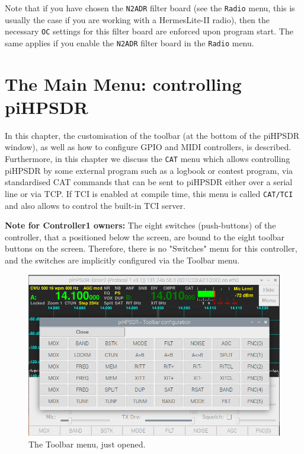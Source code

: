 \documentclass[12pt]{book}
\def\bltt#1{\texttt{\color{blue}#1}}
\def\pH{pi\-HPSDR\xspace}
\begin{document}
Note that if you have chosen the \texttt{N2ADR} filter board (see the \bltt{Radio} menu,
this is usually the
case if you are working with a HermesLite-II radio), then the necessary \bltt{OC}
settings for this filter board are enforced upon program start. The same applies if
you enable the \texttt{N2ADR} filter board in the \bltt{Radio} menu.

\chapter[Controlling \pH]{The Main Menu: controlling \pH}

In this chapter, the customisation of the toolbar (at the bottom of the \pH window),
as well as how to configure GPIO and MIDI controllers, is described. Furthermore, in this
chapter we discuss the \bltt{CAT} menu which allows controlling \pH by some external program
such as a logbook or contest program, via standardised CAT commands that can be sent to
\pH either over a serial line or via TCP. If TCI is enabled at compile  time, this menu
is called \bltt{CAT/TCI} and also allows to control the built-in TCI server.

\textbf{Note for Controller1 owners:} The eight switches (push-buttons) of the controller,
that a positioned below the screen, are bound to the eight toolbar buttons on the screen.
Therefore, there is no "Switches" menu for this controller, and the switches are implicitly
configured via the Toolbar menu.

\begin{figure}[ht]
\center
\includegraphics[width=12cm]{ToolbarMenu1.png}
\caption{The Toolbar menu, just opened.}
\label{fig:ToolbarMenu1}
\end{figure}
\end{document}
